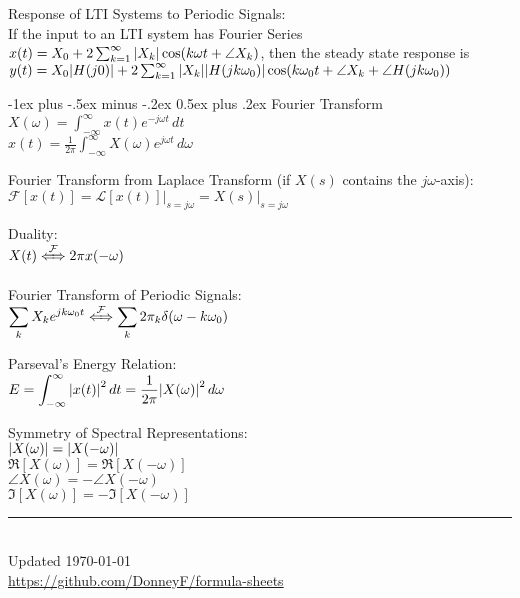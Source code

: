 \documentclass[12pt,landscape]{article}
\makeatletter
\renewcommand{\section}{\@startsection{section}{1}{0mm}%
                                {-1ex plus -.5ex minus -.2ex}%
                                {0.5ex plus .2ex}%
                                {\normalfont\normalsize\bfseries}}
\newcommand{\tab}{\hspace{.02\textwidth}}
\newcommand{\ds}{\displaystyle}
\makeatother
\begin{document}
\begin{multicols*}{3}
Response of LTI Systems to Periodic Signals:\\
\tab If the input to an LTI system has Fourier Series $x(t) = X_0 + 2\sum_{k=1}^{\infty}\abs{X_k}\cos(k\omega t + \angle X_k)$, then the steady state response is $y(t) = X_0\abs{H(j0)} + 2\sum_{k=1}^{\infty}\abs{X_k}\abs{H(jk\omega_0)}\cos(k\omega_0 t + \angle X_k + \angle H(jk\omega_0))$

\section{Fourier Transform}
\tab $\ds X(\omega) = \int_{-\infty}^{\infty}x(t)e^{-j\omega t}\,dt$\\
\tab $\ds x(t) = \frac{1}{2\pi}\int_{-\infty}^{\infty}X(\omega)e^{j\omega t}\,d\omega$

Fourier Transform from Laplace Transform (if $X(s)$ contains the $j\omega$-axis):\\
\tab $\mathcal{F}[x(t)] = \mathcal{L}[x(t)]\big\rvert_{s = j\omega} = X(s)\big\rvert_{s = j\omega}$

Duality:\\
\tab $\ds X(t) \xLeftrightarrow{\mathcal{F}} 2\pi x(-\omega)$

Fourier Transform of Periodic Signals:\\
\tab $\ds \sum_k X_k e^{jk\omega_0 t} \xLeftrightarrow{\mathcal{F}} \sum_k 2\pi_k \delta(\omega - k\omega_0)$

Parseval's Energy Relation:\\
\tab $\ds E = \int_{-\infty}^{\infty} \abs{x(t)}^2\,dt = \frac{1}{2\pi}\abs{X(\omega)}^2\,d\omega$

Symmetry of Spectral Representations:\\
\tab $\abs{X(\omega)} = \abs{X(-\omega)}$\\
\tab $\Re[X(\omega)] = \Re[X(-\omega)]$\\
\tab $\angle X(\omega) = -\angle X(-\omega)$\\
\tab $\Im[X(\omega)] = -\Im[X(-\omega)]$

\rule{0.3\linewidth}{0.25pt}
\scriptsize\\
Updated \today\\
\href{https://github.com/DonneyF/formula-sheets}{https://github.com/DonneyF/formula-sheets}
\end{multicols*}
\end{document}
